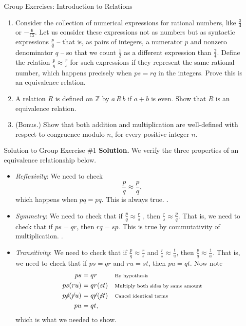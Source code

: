\documentclass[10pt]{beamer}
\begin{document}
\begin{frame}{Group Exercises: Introduction to Relations}

\begin{enumerate}
	\item Consider the collection of numerical expressions for rational numbers, like $\frac{3}{4}$ or $-\frac{6}{12}$.  Let us consider these expressions not as numbers but as syntactic expressions $\frac{p}{q}$ -- that is,  as pairs of integers, a numerator $p$ and nonzero denominator $q$ -- so that we count $\frac{1}{2}$ as a different expression than $\frac{2}{4}$.  Define the relation $\frac{p}{q} \approx \frac{r}{s}$ for such expressions if they represent the same rational number, which happens precisely when $ps=rq$ in the integers.  Prove this is an equivalence relation. 
	\item A relation $R$ is defined on $\mathbb{Z}$ by $a\,R\,b$ if $a+b$ is even.  Show that $R$ is an equivalence relation.
	\item (Bonus.) Show that both addition and multiplication are well-defined with respect to congruence modulo $n$, for every positive integer $n$.
\end{enumerate}

\end{frame}


\begin{frame}{Solution to Group Exercise \#1} 
\small 
\textbf{Solution.}  We verify the three properties of an equivalence relationship below.

\begin{itemize}
\item \textit{Reflexivity}:  We need to check
\[ \frac{p}{q} \approx \frac{p}{q},  \]
which happens when $pq=pq$. This is always true. \greencheck.
\item \textit{Symmetry}: We need to check that if $\frac{p}{q} \approx \frac{r}{s}$ , then $\frac{r}{s} \approx \frac{p}{q}$.  That is, we need to check that if $ps=qr$, then $rq=sp$. This is true by commutativity of multiplication. \greencheck.
\item \textit{Transitivity}: We need to check that if  $\frac{p}{q} \approx \frac{r}{s}$  and $\frac{r}{s} \approx \frac{t}{u}$, then $\frac{p}{q} \approx \frac{t}{u}$.  That is, we need to check that if $ps=qr$ and $ru=st$, then $pu=qt$.  Now note
\begin{align*}
ps &=qr && \text{\scriptsize{{By hypothesis}}} \\
ps(ru) &=qr(st) && \text{\scriptsize{{Multiply both sides by same amount}}} \\
p\cancel{s}(\cancel{r}u) &=q\cancel{r}(\cancel{s}t) && \text{\scriptsize{{Cancel identical terms}}} \\
pu &=qt, 	
\end{align*}
which is what we needed to show.  \greencheck
\end{itemize}


\end{frame}
\end{document}
